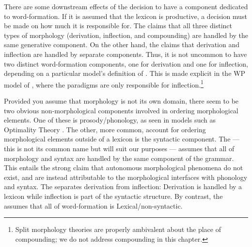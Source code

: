 \documentclass[output=paper,hidelinks]{langscibook}
\begin{document}
There are some downstream effects of the decision to have a component
dedicated to word-formation.  If it is assumed that the lexicon is
productive, a decision must be made on how much it is responsible for.
The  claims that all three
distinct types of morphology (derivation, inflection, and compounding)
are handled by the same generative component.  On the other hand, the
 claims that derivation
and inflection are handled by separate components.  Thus, it is not
uncommon to have two distinct word-formation components, one for
derivation and one for inflection, depending on a particular
model's definition of . This is made explicit in the WP
model of \citet{anderson82-wm,anderson92}, where the paradigms are
only responsible for inflection.\footnote{Split morphology theories are
properly ambivalent about the place of compounding; we do not address
compounding in this chapter.}

Provided you assume that morphology is not its own domain, there seem
to be two obvious non-morphological components involved in ordering 
morphological elements.  One of these is prosody/phonology, as seen in
models such as Optimality Theory \citep{PrinceSmolensky2004}.  The
other, more common, account for ordering morphological elements outside of
a lexicon is the syntactic component.  The  --- this is not its common name but will suit our
purposes --- assumes that all of morphology and syntax are handled by
the same component of the grammar. This entails the strong claim that
autonomous morphological phenomena do not exist, and are instead
attributable to the morphological interfaces with phonology and
syntax. The  separates derivation
from inflection: Derivation is handled by a lexicon while inflection
is part of the syntactic structure.  By contrast, the  assumes that all of
word-formation is Lexical/non-syntactic.
\end{document}
